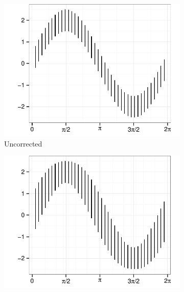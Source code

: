 \documentclass[11pt]{isuthesis}\usepackage[]{graphicx}\usepackage[]{color}
\newenvironment{knitrout}{}{} %
\begin{document}
\begin{figure}
\begin{subfigure}[b]{.32\linewidth}\centering
\begin{knitrout}
\color{fgcolor}

{\centering \includegraphics[width=\linewidth]{Figure/sineIllusion/fig-UncorRresults-1} 

}



\end{knitrout}
\caption{Uncorrected}
\end{subfigure}
\begin{subfigure}[b]{.32\linewidth}\centering
\begin{knitrout}
\color{fgcolor}

{\centering \includegraphics[width=\linewidth]{Figure/sineIllusion/fig-LinearResults-1} 

}
\end{knitrout}
\end{subfigure}
\end{figure}
\end{document}
